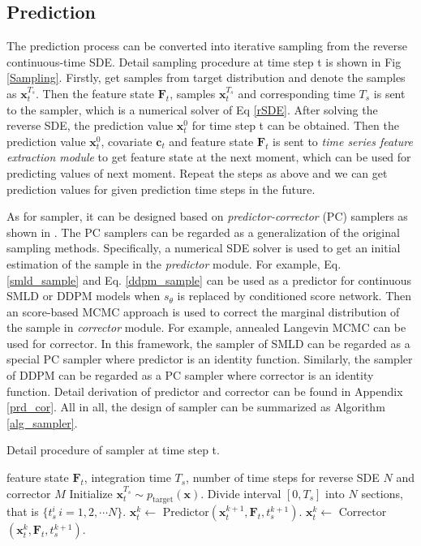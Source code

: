 \subsection{Prediction}
The prediction process can be converted into iterative sampling from the reverse continuous-time SDE. Detail sampling procedure at time step t is shown in Fig \ref{Sampling}. Firstly, get samples from target distribution and denote the samples as $\textbf{x}_t^{T_s}$. Then the feature state $\textbf{F}_t$, samples $\textbf{x}_t^{T_s}$ and corresponding time $T_s$ is sent to the sampler, which is a numerical solver of Eq \ref{rSDE}. After solving the reverse SDE, the prediction value $\textbf{x}_{t}^0$ for time step t can be obtained. Then the prediction value $\textbf{x}_{t}^0$, covariate $\textbf{c}_t$ and feature state $\textbf{F}_t$ is sent to \textit{time series feature extraction module} to get feature state at the next moment, which can be used for predicting values of next moment. Repeat the steps as above and we can get prediction values for given prediction time steps in the future.

As for sampler, it can be designed based on \textit{predictor-corrector} (PC) samplers as shown in \cite{song2020score}. The PC samplers can be regarded as a generalization of the original sampling methods. Specifically, a numerical SDE solver is used to get an initial estimation of the sample in the \textit{predictor} module. For example, Eq. \ref{smld_sample} and Eq. \ref{ddpm_sample} can be used as a predictor for continuous SMLD or DDPM models when $s_{\theta}$ is replaced by conditioned score network. Then an score-based MCMC approach is used to correct the marginal distribution of the sample in \textit{corrector} module. For example, annealed Langevin  MCMC can be used for corrector. In this framework, the sampler of SMLD can be regarded as a special PC sampler where predictor is an identity function. Similarly, the sampler of DDPM can be regarded as a PC sampler where corrector is an identity function. Detail derivation of predictor and corrector can be found in Appendix \ref{prd_cor}. All in all, the design of sampler can be summarized as Algorithm \ref{alg_sampler}. 

\begin{algorithm}
	\caption{Detail procedure of sampler at time step t.}
	\label{alg_sampler}
	\begin{algorithmic}
		\Require feature state $\textbf{F}_t$, integration time $T_s$,
		 number of time steps for reverse SDE $N$ and corrector $M$
		\State Initialize $\textbf{x}_t^{T_s}\sim p_{\text{target}}(\textbf{x})$.
		\State Divide interval $[0,T_s]$ into $N$ sections, that is $\{t_s^i\, i=1,2,\cdots N\}$.
		\State $\textbf{x}_t^k\leftarrow$ Predictor$(\textbf{x}_{t}^{k+1}, \textbf{F}_t, t_s^{k+1})$.
		\State $\textbf{x}_t^k\leftarrow$ Corrector$(\textbf{x}_{t}^{k}, \textbf{F}_t, t_s^{k+1})$.	
		\EndFor
		\EndFor
	\end{algorithmic}
\end{algorithm}

